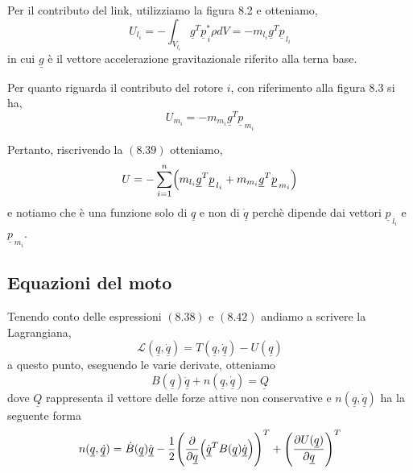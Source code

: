 Per il contributo del link, utilizziamo la figura 8.2 e otteniamo,
\begin{equation}
	U_{l_i} = - \int_{V_{l_i}} \underline{g}^T \underline{p}_{\,i}^* \rho dV = -m_{l_i} \underline{g}^T \underline{p}_{\,l_i}
\end{equation}
in cui $\underline{g}$ è il vettore accelerazione gravitazionale riferito alla terna base.

Per quanto riguarda il contributo del rotore $i$, con riferimento alla figura 8.3 si ha,
\begin{equation}
	U_{m_i} = - m_{m_i} \underline{g}^T \underline{p}_{\,m_i}
\end{equation}

Pertanto, riscrivendo la $(8.39)$ otteniamo,
\begin{equation}
	U = - \sum_{i=1}^n \Bigl( m_{l_i} \underline{g}^T \underline{p}_{\,l_i} + m_{m_i} \underline{g}^T \underline{p}_{\,m_i} \Bigr)
\end{equation}
e notiamo che è una funzione solo di $\underline{q}$ e non di $\underline{\dot{q}}$ perchè dipende dai vettori $\underline{p}_{\,l_i}$ e $\underline{p}_{\,m_i}$. 

\subsection{Equazioni del moto}
Tenendo conto delle espressioni $(8.38)$ e $(8.42)$ andiamo a scrivere la Lagrangiana,
\begin{equation}
	\mathcal{L}(\underline{q}, \dot{\underline{q}}) = T(\underline{q}, \dot{\underline{q}}) - U(\underline{q})
\end{equation}
a questo punto, eseguendo le varie derivate, otteniamo
\begin{equation}
	B(\underline{q})\ddot{\underline{q}} + n(\underline{q}, \underline{\dot{q}}) = \underline{Q}
\end{equation}
dove $\underline{Q}$ rappresenta il vettore delle forze attive non conservative e $n(\underline{q}, \underline{\dot{q}})$ ha la seguente forma
\begin{equation}
	n(\underline{q}, \underline{\dot{q}}) = \dot{B}(\underline{q})\dot{\underline{q}} - \frac{1}{2} \Biggl( \frac{\partial}{\partial \underline{q}} \Bigl( \dot{\underline{q}}^T B(\underline{q}) \dot{\underline{q}} \Bigr) \Biggr)^T + \Biggl( \frac{\partial U(\underline{q})}{\partial \underline{q}} \Biggr)^T 
\end{equation}
